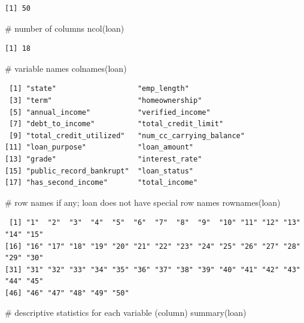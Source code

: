 \documentclass[
  letterpaper,
  DIV=11,
  numbers=noendperiod]{scrreprt}
\newenvironment{Shaded}{\begin{snugshade}}{\end{snugshade}}
\newcommand{\CommentTok}[1]{\textcolor[rgb]{0.37,0.37,0.37}{#1}}
\newcommand{\FunctionTok}[1]{\textcolor[rgb]{0.28,0.35,0.67}{#1}}
\newcommand{\NormalTok}[1]{\textcolor[rgb]{0.00,0.23,0.31}{#1}}
\begin{document}
\begin{tcolorbox}
\begin{verbatim}
[1] 50
\end{verbatim}

\begin{Shaded}
\begin{Highlighting}[]
\CommentTok{\# number of columns}
\FunctionTok{ncol}\NormalTok{(loan)}
\end{Highlighting}
\end{Shaded}

\begin{verbatim}
[1] 18
\end{verbatim}

\begin{Shaded}
\begin{Highlighting}[]
\CommentTok{\# variable names}
\FunctionTok{colnames}\NormalTok{(loan)}
\end{Highlighting}
\end{Shaded}

\begin{verbatim}
 [1] "state"                   "emp_length"             
 [3] "term"                    "homeownership"          
 [5] "annual_income"           "verified_income"        
 [7] "debt_to_income"          "total_credit_limit"     
 [9] "total_credit_utilized"   "num_cc_carrying_balance"
[11] "loan_purpose"            "loan_amount"            
[13] "grade"                   "interest_rate"          
[15] "public_record_bankrupt"  "loan_status"            
[17] "has_second_income"       "total_income"           
\end{verbatim}

\begin{Shaded}
\begin{Highlighting}[]
\CommentTok{\# row names if any; loan does not have special row names}
\FunctionTok{rownames}\NormalTok{(loan)}
\end{Highlighting}
\end{Shaded}

\begin{verbatim}
 [1] "1"  "2"  "3"  "4"  "5"  "6"  "7"  "8"  "9"  "10" "11" "12" "13" "14" "15"
[16] "16" "17" "18" "19" "20" "21" "22" "23" "24" "25" "26" "27" "28" "29" "30"
[31] "31" "32" "33" "34" "35" "36" "37" "38" "39" "40" "41" "42" "43" "44" "45"
[46] "46" "47" "48" "49" "50"
\end{verbatim}

\begin{Shaded}
\begin{Highlighting}[]
\CommentTok{\# descriptive statistics for each variable (column)}
\FunctionTok{summary}\NormalTok{(loan)}
\end{Highlighting}
\end{Shaded}


\end{tcolorbox}
\end{document}
